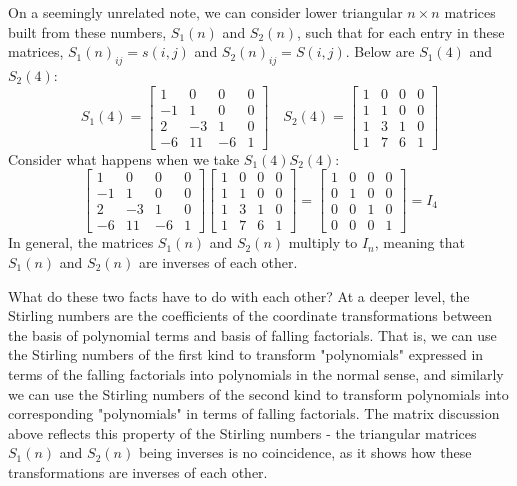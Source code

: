 On a seemingly unrelated note, we can consider lower triangular $n\times n$ matrices built from these numbers, $S_1(n)$ and $S_2(n)$, such that for each entry in these matrices, $S_1(n)_{ij} = s(i, j)$ and $S_2(n)_{ij} = S(i, j)$. Below are $S_1(4)$ and $S_2(4)$: 
\[
	S_1(4) = \begin{bmatrix}
		1 & 0 & 0 & 0 \\
		-1 & 1 & 0 & 0 \\
		2 & -3 & 1 & 0 \\
		-6 & 11 & -6 & 1
	\end{bmatrix}	\quad 
	S_2(4) = \begin{bmatrix}
		1 & 0 & 0 & 0 \\
		1 & 1 & 0 & 0 \\
		1 & 3 & 1 & 0 \\
		1 & 7 & 6 & 1
	\end{bmatrix}	
\]
Consider what happens when we take $S_1(4)S_2(4)$: 
\[
\begin{bmatrix}
		1 & 0 & 0 & 0 \\
		-1 & 1 & 0 & 0 \\
		2 & -3 & 1 & 0 \\
		-6 & 11 & -6 & 1
	\end{bmatrix}	
	\begin{bmatrix}
		1 & 0 & 0 & 0 \\
		1 & 1 & 0 & 0 \\
		1 & 3 & 1 & 0 \\
		1 & 7 & 6 & 1
	\end{bmatrix}	=
	\begin{bmatrix}
		1 & 0 & 0 & 0 \\
		0 & 1 & 0 & 0 \\
		0 & 0 & 1 & 0 \\
		0 & 0 & 0 & 1
	\end{bmatrix} = I_4
\]
In general, the matrices $S_1(n)$ and $S_2(n)$ multiply to $I_n$, meaning that $S_1(n)$ and $S_2(n)$ are inverses of each other. 

What do these two facts have to do with each other? At a deeper level, the Stirling numbers are the coefficients of the coordinate transformations between the basis of polynomial terms and basis of falling factorials. That is, we can use the Stirling numbers of the first kind to transform "polynomials" expressed in terms of the falling factorials into polynomials in the normal sense, and similarly we can use the Stirling numbers of the second kind to transform polynomials into corresponding "polynomials" in terms of falling factorials. The matrix discussion above reflects this property of the Stirling numbers - the triangular matrices $S_1(n)$ and $S_2(n)$ being inverses is no coincidence, as it shows how these transformations are inverses of each other. 

